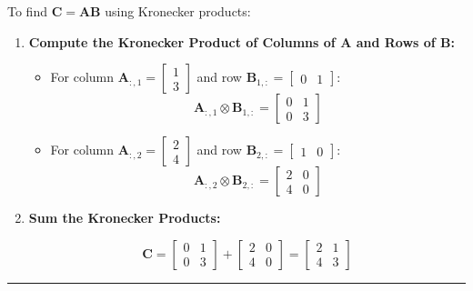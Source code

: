 \documentclass[
  letterpaper,
  DIV=11,
  numbers=noendperiod]{scrreprt}
\theoremstyle{plain}
\theoremstyle{definition}
\theoremstyle{remark}
\begin{document}
To find \(\mathbf{C} = \mathbf{A} \mathbf{B}\) using Kronecker products:

\begin{enumerate}
\def\labelenumi{\arabic{enumi}.}
\item
  \textbf{Compute the Kronecker Product of Columns of \(\mathbf{A}\) and
  Rows of \(\mathbf{B}\):}

  \begin{itemize}
  \item
    For column
    \(\mathbf{A}_{:,1} = \begin{bmatrix} 1 \\ 3 \end{bmatrix}\) and row
    \(\mathbf{B}_{1,:} = \begin{bmatrix} 0 & 1 \end{bmatrix}\):
    \[\mathbf{A}_{:,1} \otimes \mathbf{B}_{1,:} = \begin{bmatrix}     0 & 1 \\     0 & 3     \end{bmatrix}\]
  \item
    For column
    \(\mathbf{A}_{:,2} = \begin{bmatrix} 2 \\ 4 \end{bmatrix}\) and row
    \(\mathbf{B}_{2,:} = \begin{bmatrix} 1 & 0 \end{bmatrix}\):
    \[\mathbf{A}_{:,2} \otimes \mathbf{B}_{2,:} = \begin{bmatrix}2 & 0 \\ 4 & 0\end{bmatrix}\]
  \end{itemize}
\item
  \textbf{Sum the Kronecker Products:}

  \[\mathbf{C} = \begin{bmatrix}0 & 1 \\ 0 & 3\end{bmatrix} +\begin{bmatrix} 2 & 0 \\ 4 & 0 \end{bmatrix}  = \begin{bmatrix} 2 & 1 \\ 4 & 3\end{bmatrix}\]
\end{enumerate}

\begin{center}\rule{0.5\linewidth}{0.5pt}\end{center}
\end{document}
